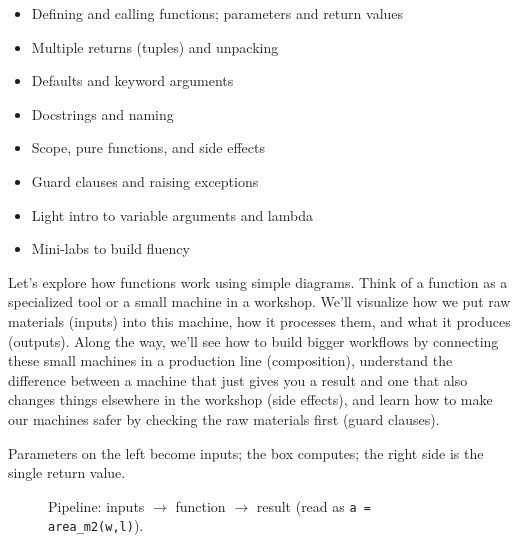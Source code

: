\begin{tcolorbox}[%
    title=Focus of this chapter:,
    colframe=orange,
    colback = white,
    arc=2mm %
 ]
\begin{itemize}
    \item Defining and calling functions; parameters and return values
    \item Multiple returns (tuples) and unpacking
    \item Defaults and keyword arguments
    \item Docstrings and naming
    \item Scope, pure functions, and side effects
    \item Guard clauses and raising exceptions
    \item Light intro to variable arguments and lambda
    \item Mini-labs to build fluency
\end{itemize}
\end{tcolorbox}

Let's explore how functions work using simple diagrams. Think of a function as a specialized tool or a small machine in a workshop. We'll visualize how we put raw materials (inputs) into this machine, how it processes them, and what it produces (outputs). Along the way, we'll see how to build bigger workflows by connecting these small machines in a production line (composition), understand the difference between a machine that just gives you a result and one that also changes things elsewhere in the workshop (side effects), and learn how to make our machines safer by checking the raw materials first (guard clauses).

Parameters on the left become inputs; the box computes; the right side is the single return value.

\begin{figure}[h]
\centering
{}
\caption{Pipeline: inputs $\rightarrow$ function $\rightarrow$ result (read as \texttt{a = area\_m2(w,l)}).}
\label{fig:c10_func_pipeline_single}
\end{figure}

